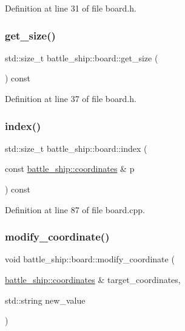 Definition at line 31 of file board.\+h.

\mbox{\label{classbattle__ship_1_1board_aea7bba93d5c16b0c550b5874e0ce04a7}} 
\subsubsection{\texorpdfstring{get\+\_\+size()}{get\_size()}}
{\footnotesize\ttfamily std\+::size\+\_\+t battle\+\_\+ship\+::board\+::get\+\_\+size (\begin{DoxyParamCaption}{ }\end{DoxyParamCaption}) const\hspace{0.3cm}{\ttfamily [inline]}}



Definition at line 37 of file board.\+h.

\mbox{\label{classbattle__ship_1_1board_a6469025697317ca96be621908464a2c0}} 
\subsubsection{\texorpdfstring{index()}{index()}}
{\footnotesize\ttfamily std\+::size\+\_\+t battle\+\_\+ship\+::board\+::index (\begin{DoxyParamCaption}\item[{const \hyperlink{structbattle__ship_1_1coordinates}{battle\+\_\+ship\+::coordinates} \&}]{p }\end{DoxyParamCaption}) const}



Definition at line 87 of file board.\+cpp.

\mbox{\label{classbattle__ship_1_1board_a9dd8f7b3681cc8ed1c5309a796f377e2}} 
\subsubsection{\texorpdfstring{modify\+\_\+coordinate()}{modify\_coordinate()}}
{\footnotesize\ttfamily void battle\+\_\+ship\+::board\+::modify\+\_\+coordinate (\begin{DoxyParamCaption}\item[{\hyperlink{structbattle__ship_1_1coordinates}{battle\+\_\+ship\+::coordinates} \&}]{target\+\_\+coordinates,  }\item[{std\+::string}]{new\+\_\+value }\end{DoxyParamCaption})}



